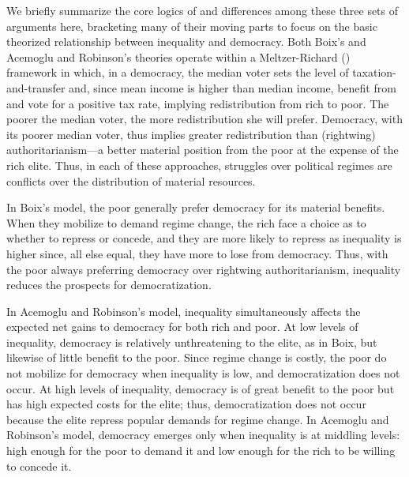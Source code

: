 \documentclass[
  12pt,
]{book}
\begin{document}
We briefly summarize the core logics of and differences among these three sets of arguments here, bracketing many of their moving parts to focus on the basic theorized relationship between inequality and democracy. Both Boix's and Acemoglu and Robinson's theories operate within a Meltzer-Richard (\citet{meltzer1981rational}) framework in which, in a democracy, the median voter sets the level of taxation-and-transfer and, since mean income is higher than median income, benefit from and vote for a positive tax rate, implying redistribution from rich to poor. The poorer the median voter, the more redistribution she will prefer. Democracy, with its poorer median voter, thus implies greater redistribution than (rightwing) authoritarianism---a better material position from the poor at the expense of the rich elite. Thus, in each of these approaches, struggles over political regimes are conflicts over the distribution of material resources.

In Boix's model, the poor generally prefer democracy for its material benefits. When they mobilize to demand regime change, the rich face a choice as to whether to repress or concede, and they are more likely to repress as inequality is higher since, all else equal, they have more to lose from democracy. Thus, with the poor always preferring democracy over rightwing authoritarianism, inequality reduces the prospects for democratization.

In Acemoglu and Robinson's model, inequality simultaneously affects the expected net gains to democracy for both rich and poor. At low levels of inequality, democracy is relatively unthreatening to the elite, as in Boix, but likewise of little benefit to the poor. Since regime change is costly, the poor do not mobilize for democracy when inequality is low, and democratization does not occur. At high levels of inequality, democracy is of great benefit to the poor but has high expected costs for the elite; thus, democratization does not occur because the elite repress popular demands for regime change. In Acemoglu and Robinson's model, democracy emerges only when inequality is at middling levels: high enough for the poor to demand it and low enough for the rich to be willing to concede it.
\end{document}

